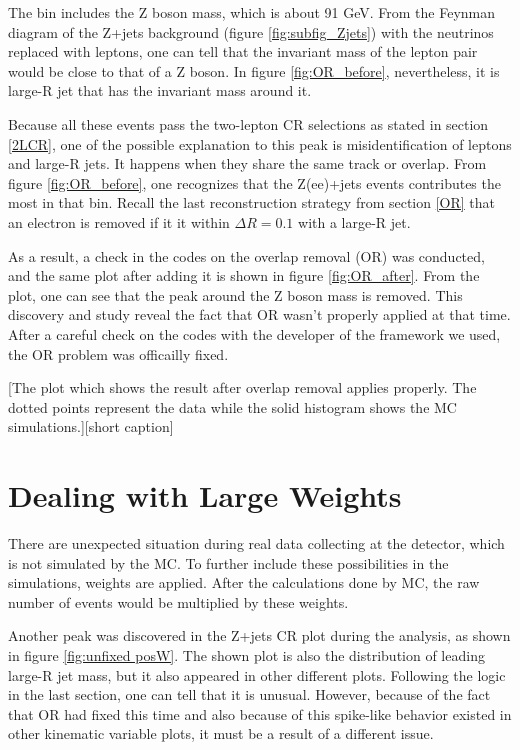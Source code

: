 \documentclass[class=NCU_thesis, crop=false]{standalone}
\begin{document}
		The bin includes the Z boson mass, which is about 91 GeV. From the Feynman diagram of the Z+jets background (figure \ref{fig:subfig_Zjets}) with the neutrinos replaced with leptons, one can tell that the invariant mass of the lepton pair would be close to that of a Z boson. In figure \ref{fig:OR_before}, nevertheless, it is large-R jet that has the invariant mass around it.

		Because all these events pass the two-lepton CR selections as stated in section \ref{2LCR}, one of the possible explanation to this peak is misidentification of leptons and large-R jets. It happens when they share the same track or overlap. From figure \ref{fig:OR_before}, one recognizes that the Z(ee)+jets events contributes the most in that bin. Recall the last reconstruction strategy from section \ref{OR} that an electron is removed if it it within $\Delta R = 0.1$ with a large-R jet.
		
		As a result, a check in the codes on the overlap removal (OR) was conducted, and the same plot after adding it is shown in figure \ref{fig:OR_after}. From the plot, one can see that the peak around the Z boson mass is removed. This discovery and study reveal the fact that OR wasn't properly applied at that time. After a careful check on the codes with the developer of the framework we used, the OR problem was officailly fixed.
		
		[The plot which shows the result after overlap removal applies properly. The dotted points represent the data while the solid histogram shows the MC simulations.][short caption]
	
	\section{Dealing with Large Weights}
		There are unexpected situation during real data collecting at the detector, which is not simulated by the MC. To further include these possibilities in the simulations, weights are applied. After the calculations done by MC, the raw number of events would be multiplied by these weights.
		
		Another peak was discovered in the Z+jets CR plot during the analysis, as shown in figure \ref{fig:unfixed posW}. The shown plot is also the distribution of leading large-R jet mass, but it also appeared in other different plots. Following the logic in the last section, one can tell that it is unusual. However, because of the fact that OR had fixed this time and also because of this spike-like behavior existed in other kinematic variable plots, it must be a result of a different issue.
		
\end{document}
